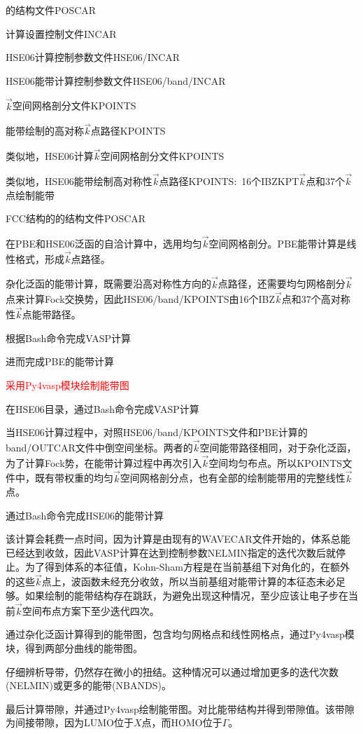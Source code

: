的结构文件\textrm{POSCAR}

计算设置控制文件\textrm{INCAR}

\textrm{HSE06}计算控制参数文件\textrm{HSE06/INCAR}

\textrm{HSE06}能带计算控制参数文件\textrm{HSE06/band/INCAR}

$\vec k$空间网格剖分文件\textrm{KPOINTS}

能带绘制的高对称$\vec k$点路径\textrm{KPOINTS}

类似地，\textrm{HSE06}计算$\vec k$空间网格剖分文件\textrm{KPOINTS}

类似地，\textrm{HSE06}能带绘制高对称性$\vec k$点路径\textrm{KPOINTS}:~16个\textrm{IBZKPT}$\vec k$点和37个$\vec k$点绘制能带

\textrm{FCC}结构的的结构文件\textrm{POSCAR}

在\textrm{PBE}和\textrm{HSE06}泛函的自洽计算中，选用均匀$\vec k$空间网格剖分。\textrm{PBE}能带计算是线性格式，形成$\vec k$点路径。

杂化泛函的能带计算，既需要沿高对称性方向的$\vec k$点路径，还需要均匀网格剖分$\vec k$点来计算\textrm{Fock}交换势，因此\textrm{HSE06/band/KPOINTS}由16个\textrm{IBZ}$\vec k$点和37个高对称性$\vec k$点能带路径。

根据\textrm{Bash}命令完成\textrm{VASP}计算

进而完成\textrm{PBE}的能带计算

\textcolor{red}{采用\textrm{Py4vasp}模块绘制能带图}

在\textrm{HSE06}目录，通过\textrm{Bash}命令完成\textrm{VASP}计算

当\textrm{HSE06}计算过程中，对照\textrm{HSE06/band/KPOINTS}文件和\textrm{PBE}计算的\textrm{band/OUTCAR}文件中倒空间坐标。两者的$\vec k$空间能带路径相同，对于杂化泛函，为了计算\textrm{Fock}势，在能带计算过程中再次引入$\vec k$空间均匀布点。所以\textrm{KPOINTS}文件中，既有带权重的均匀$\vec k$空间网格剖分点，也有全部的绘制能带用的完整线性$\vec k$点。

通过\textrm{Bash}命令完成\textrm{HSE06}的能带计算

该计算会耗费一点时间，因为计算是由现有的\textrm{WAVECAR}文件开始的，体系总能已经达到收敛，因此\textrm{VASP}计算在达到控制参数\textrm{NELMIN}指定的迭代次数后就停止。为了得到体系的本征值，\textrm{Kohn-Sham}方程是在当前基组下对角化的，在额外的这些$\vec k$点上，波函数未经充分收敛，所以当前基组对能带计算的本征态未必足够。如果绘制的能带结构存在跳跃，为避免出现这种情况，至少应该让电子步在当前$\vec k$空间布点方案下至少迭代四次。

通过杂化泛函计算得到的能带图，包含均匀网格点和线性网格点，通过\textrm{Py4vasp}模块，得到两部分曲线的能带图。%

仔细辨析导带，仍然存在微小的扭结。这种情况可以通过增加更多的迭代次数\textrm{(NELMIN)}或更多的能带\textrm{(NBANDS)}。

最后计算带隙，并通过\textrm{Py4vasp}绘制能带图。对比能带结构并得到带隙值。该带隙为间接带隙，因为\textrm{LUMO}位于$X$点，而\textrm{HOMO}位于$\Gamma$。
